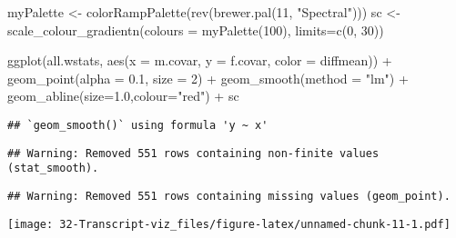 \documentclass[
]{article}
\newenvironment{Shaded}{\begin{snugshade}}{\end{snugshade}}
\newcommand{\AttributeTok}[1]{\textcolor[rgb]{0.77,0.63,0.00}{#1}}
\newcommand{\DecValTok}[1]{\textcolor[rgb]{0.00,0.00,0.81}{#1}}
\newcommand{\FloatTok}[1]{\textcolor[rgb]{0.00,0.00,0.81}{#1}}
\newcommand{\FunctionTok}[1]{\textcolor[rgb]{0.00,0.00,0.00}{#1}}
\newcommand{\NormalTok}[1]{#1}
\newcommand{\OtherTok}[1]{\textcolor[rgb]{0.56,0.35,0.01}{#1}}
\newcommand{\SpecialCharTok}[1]{\textcolor[rgb]{0.00,0.00,0.00}{#1}}
\newcommand{\StringTok}[1]{\textcolor[rgb]{0.31,0.60,0.02}{#1}}
\begin{document}
\begin{Shaded}
\begin{Highlighting}[]
\NormalTok{myPalette }\OtherTok{\textless{}{-}} \FunctionTok{colorRampPalette}\NormalTok{(}\FunctionTok{rev}\NormalTok{(}\FunctionTok{brewer.pal}\NormalTok{(}\DecValTok{11}\NormalTok{, }\StringTok{"Spectral"}\NormalTok{)))}
\NormalTok{sc }\OtherTok{\textless{}{-}} \FunctionTok{scale\_colour\_gradientn}\NormalTok{(}\AttributeTok{colours =} \FunctionTok{myPalette}\NormalTok{(}\DecValTok{100}\NormalTok{), }\AttributeTok{limits=}\FunctionTok{c}\NormalTok{(}\DecValTok{0}\NormalTok{, }\DecValTok{30}\NormalTok{))}

\FunctionTok{ggplot}\NormalTok{(all.wstats, }\FunctionTok{aes}\NormalTok{(}\AttributeTok{x =}\NormalTok{ m.covar, }\AttributeTok{y =}\NormalTok{ f.covar, }\AttributeTok{color =}\NormalTok{ diffmean)) }\SpecialCharTok{+}
  \FunctionTok{geom\_point}\NormalTok{(}\AttributeTok{alpha =} \FloatTok{0.1}\NormalTok{, }\AttributeTok{size =} \DecValTok{2}\NormalTok{) }\SpecialCharTok{+}
  \FunctionTok{geom\_smooth}\NormalTok{(}\AttributeTok{method =} \StringTok{"lm"}\NormalTok{) }\SpecialCharTok{+}
  \FunctionTok{geom\_abline}\NormalTok{(}\AttributeTok{size=}\FloatTok{1.0}\NormalTok{,}\AttributeTok{colour=}\StringTok{"red"}\NormalTok{) }\SpecialCharTok{+}
\NormalTok{  sc }
\end{Highlighting}
\end{Shaded}

\begin{verbatim}
## `geom_smooth()` using formula 'y ~ x'
\end{verbatim}

\begin{verbatim}
## Warning: Removed 551 rows containing non-finite values (stat_smooth).
\end{verbatim}

\begin{verbatim}
## Warning: Removed 551 rows containing missing values (geom_point).
\end{verbatim}

\texttt{[image: 32-Transcript-viz\_files/figure-latex/unnamed-chunk-11-1.pdf]}
\end{document}
